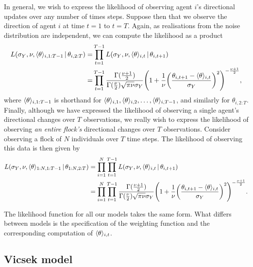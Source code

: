 In general, we wish to express the likelihood of observing agent $i$'s directional updates
over any number of times steps. Suppose then that we observe the direction of agent $i$
at time $t=1$ to $t=T$. Again, as realisations from the noise distribution are
independent, we can compute the likelihood as a product
\begin{align*}
    L(\sigma_Y, \nu, \langle\theta\rangle_{i,1:T-1} \,|\, \theta_{i,2:T})
    =& \prod_{t=1}^{T-1} L(\sigma_Y,\nu,\langle\theta\rangle_{i,t} \,|\, \theta_{i,t+1}) \\
    =& \prod_{t=1}^{T-1} 
        \frac{\Gamma(\frac{\nu +1 }{2})}{\Gamma(\frac{\nu}{2})\sqrt{\pi\nu}\sigma_Y}
        \Bigg(1 + \frac{1}{\nu}
                  \bigg(\frac{\theta_{i,t+1}-\langle\theta\rangle_{i,t}}{\sigma_Y}\bigg)^2
        \Bigg)^{-\frac{\nu+1}{2}},
\end{align*}
where $\langle\theta\rangle_{i,1:T-1}$ is shorthand for
$\langle\theta\rangle_{i,1},\langle\theta\rangle_{i,2},\ldots,\langle\theta\rangle_{i,T-1}$, and
similarly for $\theta_{i,2:T}$. Finally, although we have expressed the likelihood of
observing a single agent's directional changes over $T$ observations, we really wish to
express the likelihood of observing \emph{an entire flock's} directional changes over $T$
observations. Consider observing a flock of $N$ individuals over $T$ time steps. The
likelihood of observing this data is then given by
\begin{align}
    \label{eq:likelihood}
    \begin{split}
    L(\sigma_Y, \nu, \langle\theta\rangle_{1:N,1:T-1} \,|\,\theta_{1:N,2:T}) 
    &= \prod_{i=1}^N \prod_{t=1}^{T-1} L(\sigma_Y,\nu,\langle\theta\rangle_{i,t}\,|\,\theta_{i,t+1})  \\
    &= \prod_{i=1}^N \prod_{t=1}^{T-1} 
        \frac{\Gamma(\frac{\nu +1 }{2})}{\Gamma(\frac{\nu}{2})\sqrt{\pi\nu}\sigma_Y}
        \Bigg(1 + \frac{1}{\nu}
                  \bigg(\frac{\theta_{i,t+1}-\langle\theta\rangle_{i,t}}{\sigma_Y}\bigg)^2
        \Bigg)^{-\frac{\nu+1}{2}}.
    \end{split}
\end{align}

The likelihood function for all our models takes the same form. What differs
between models is the specification of the weighting function and the
corresponding computation of $\langle\theta\rangle_{i,t}$.

\subsection{Vicsek model}

